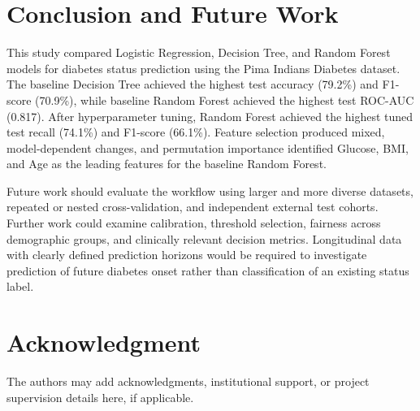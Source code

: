 \documentclass[12pt,a4paper]{article}
\begin{document}
\clearpage
\section{Conclusion and Future Work}
This study compared Logistic Regression, Decision Tree, and Random Forest models for diabetes status prediction using the Pima Indians Diabetes dataset. The baseline Decision Tree achieved the highest test accuracy (79.2\%) and F1-score (70.9\%), while baseline Random Forest achieved the highest test ROC-AUC (0.817). After hyperparameter tuning, Random Forest achieved the highest tuned test recall (74.1\%) and F1-score (66.1\%). Feature selection produced mixed, model-dependent changes, and permutation importance identified Glucose, BMI, and Age as the leading features for the baseline Random Forest.

Future work should evaluate the workflow using larger and more diverse datasets, repeated or nested cross-validation, and independent external test cohorts. Further work could examine calibration, threshold selection, fairness across demographic groups, and clinically relevant decision metrics. Longitudinal data with clearly defined prediction horizons would be required to investigate prediction of future diabetes onset rather than classification of an existing status label.

\clearpage
\section*{Acknowledgment}
The authors may add acknowledgments, institutional support, or project supervision details here, if applicable.

\clearpage


\end{document}
